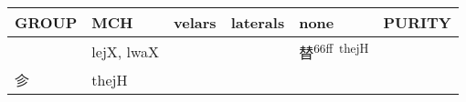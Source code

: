 \documentclass[14pt,a4paper]{scrartcl}
\begin{document}
\begin{longtable}[c]{@{}llllll@{}}
\toprule
\begin{minipage}[b]{0.14\columnwidth}\raggedright\strut
GROUP
\strut\end{minipage} &
\begin{minipage}[b]{0.14\columnwidth}\raggedright\strut
MCH
\strut\end{minipage} &
\begin{minipage}[b]{0.14\columnwidth}\raggedright\strut
velars
\strut\end{minipage} &
\begin{minipage}[b]{0.14\columnwidth}\raggedright\strut
laterals
\strut\end{minipage} &
\begin{minipage}[b]{0.14\columnwidth}\raggedright\strut
none
\strut\end{minipage} &
\begin{minipage}[b]{0.14\columnwidth}\raggedright\strut
PURITY
\strut\end{minipage}\tabularnewline
\midrule
\endhead
\begin{minipage}[t]{0.14\columnwidth}\raggedright\strut
𤾕
\strut\end{minipage} &
\begin{minipage}[t]{0.14\columnwidth}\raggedright\strut
lejX, lwaX
\strut\end{minipage} &
\begin{minipage}[t]{0.14\columnwidth}\raggedright\strut
\strut\end{minipage} &
\begin{minipage}[t]{0.14\columnwidth}\raggedright\strut
\strut\end{minipage} &
\begin{minipage}[t]{0.14\columnwidth}\raggedright\strut
替\textsuperscript{66ff~thejH}
\strut\end{minipage} &
\begin{minipage}[t]{0.14\columnwidth}\raggedright\strut
\strut\end{minipage}\tabularnewline
\begin{minipage}[t]{0.14\columnwidth}\raggedright\strut
㐱
\strut\end{minipage} &
\begin{minipage}[t]{0.14\columnwidth}\raggedright\strut
thejH
\strut\end{minipage} &
\begin{minipage}[t]{0.14\columnwidth}\raggedright\strut
\strut\end{minipage} &

\end{longtable}
\end{document}
